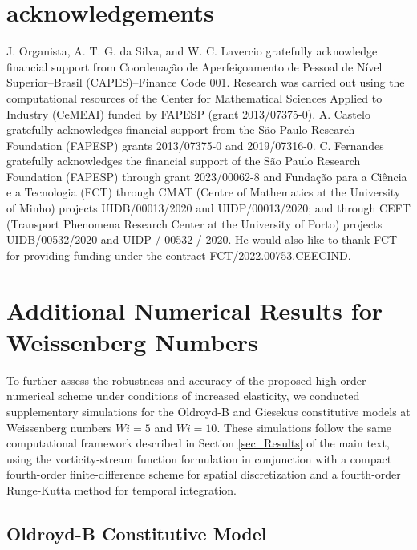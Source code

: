\documentclass[preprint, 12pt]{elsarticle}
\begin{document}
\section*{acknowledgements}
J. Organista, A. T. G. da Silva, and W. C. Lavercio gratefully acknowledge financial support from Coordenação de Aperfeiçoamento de Pessoal de Nível Superior–Brasil (CAPES)–Finance Code 001. Research was carried out using the computational resources of the Center for Mathematical Sciences Applied to Industry (CeMEAI) funded by FAPESP (grant 2013/07375-0). A. Castelo gratefully acknowledges financial support from the São Paulo Research Foundation (FAPESP) grants 2013/07375-0 and 2019/07316-0. C. Fernandes gratefully acknowledges the financial support of the São Paulo Research Foundation (FAPESP) through grant 2023/00062-8 and Fundação para a Ciência e a Tecnologia (FCT) through CMAT (Centre of Mathematics at the University of Minho) projects UIDB/00013/2020 and UIDP/00013/2020; and through CEFT (Transport Phenomena Research Center at the University of Porto) projects UIDB/00532/2020 and UIDP / 00532 / 2020. He would also like to thank FCT for providing funding under the contract FCT/2022.00753.CEECIND.

% 

% 



\appendix
\section{Additional Numerical Results for Weissenberg Numbers}\label{Appendix_more_wi}

To further assess the robustness and accuracy of the proposed high-order numerical scheme under conditions of increased elasticity, we conducted supplementary simulations for the Oldroyd-B and Giesekus constitutive models at Weissenberg numbers $Wi = 5$ and $Wi = 10$. These simulations follow the same computational framework described in Section \ref{sec_Results} of the main text, using the vorticity-stream function formulation in conjunction with a compact fourth-order finite-difference scheme for spatial discretization and a fourth-order Runge-Kutta method for temporal integration.

\subsection{Oldroyd-B Constitutive Model}
\label{Appendix_more_wi_oldroydb}
\end{document}
